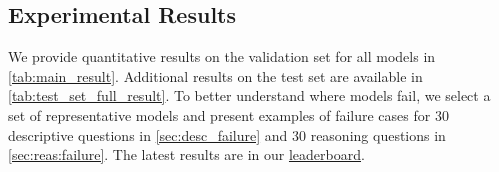 \subsection{Experimental Results}
\label{subsec:exp_results}
We provide quantitative results on the validation set for all models in \cref{tab:main_result}. Additional results on the test set are available in \cref{tab:test_set_full_result}. To better understand where models fail, we select a set of representative models \cite{openai2024gpt4, claude3, rekateam2024reka, chen2024far, li2024minigemini, laurenccon2024matters} and present examples of failure cases for 30 descriptive questions in \cref{sec:desc_failure} and 30 reasoning questions in \cref{sec:reas:failure}. The latest results are in our \href{https://charxiv.github.io/#leaderboard}{leaderboard}.

